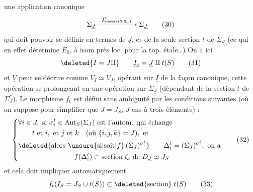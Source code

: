 une application canonique
\[
\Sigma_{\underline J}\xrightarrow{\ f^{t}_{\unsure{2|2_0}}\ }\Sigma_{\underline J}
\tag*{(30)}
\]
qui doit pouvoir se définir en termes de $\underline J$, et de la seule section $t$ de $\Sigma_{\underline J}$ (ce qui en effet détermine $E_0$, à isom  près loc. pour la top. étale\ldots) On a ici
\[
\deleted{I=J\amalg}\qquad \underline I_t=\underline J\amalg t(S)
\tag*{(31)}
\]
et  $\underline V$ peut se décrire comme $V_{\underline I}\simeq V_{\underline J}$, opérant sur $\underline I$ de la façon canonique, cette opération se prolongeant en une opération sur $\Sigma_{\underline J}$ (dépendant de la section $t$ de $\Sigma_{\underline J}^*$). Le  morphisme $f_t$ est défini sans ambiguïté par les conditions suivantes (où on suppose pour simplifier que $\underline J=J_S$, $J$ ens à trois éléments) :
\[
\left\{\begin{aligned}
&\forall i\in J,\ \text{si }\sigma_i^t\in\operatorname{Aut}_S(\Sigma_J)
  \text{ est l'autom. qui échange}\\
&\qquad t\text{ et }i,\text{ et }j\text{ et }k\quad(\text{où }\{i,j,k\}=J),\text{ et}\\
&\deleted{\text{alors }\unsure{\text{si}|\text{soit}|f}\,(\Sigma_J)^{\sigma_i^t}}
  \qquad\Delta_i^t=(\Sigma_J)^{\sigma_i^t},\ \text{on a}\\
&\hspace{8em}f(\Delta_i^t)\subset\text{section }\zeta_i\text{ de }D_{\underline J}\simeq J_S
\end{aligned}\right.
\tag*{(32)}
\]
et cela doit impliquer automatiquement
\[
f_t(I_S=J_S\cup t(S))\subset\deleted{\text{section}}\;t(S)
\tag*{(33)}
\]
